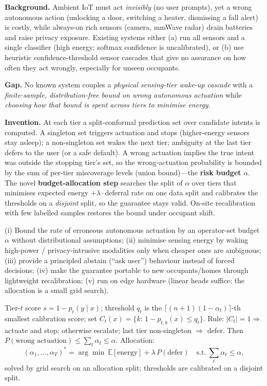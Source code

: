 \documentclass[10pt,a4paper]{article}
\newcommand{\sect}[1]{\par\vspace{5pt}{\bfseries\large #1}\par\vspace{1pt}}
\begin{document}
\sect{4. Summary and background of the invention (gap / novelty)}
\textbf{Background.} Ambient IoT must act \emph{invisibly} (no user prompts), yet a wrong autonomous action (unlocking a door, switching a heater, dismissing a fall alert) is costly, while always-on rich sensors (camera, mmWave radar) drain batteries and raise privacy exposure. Existing systems either (a) run all sensors and a single classifier (high energy; softmax confidence is uncalibrated), or (b) use heuristic confidence-threshold sensor cascades that give no assurance on how often they act wrongly, especially for unseen occupants.

\textbf{Gap.} No known system couples a \emph{physical sensing-tier wake-up cascade} with a \emph{finite-sample, distribution-free bound on wrong autonomous actuation} while \emph{choosing how that bound is spent across tiers to minimise energy}.

\textbf{Invention.} At each tier a split-conformal prediction set over candidate intents is computed. A singleton set triggers actuation and stops (higher-energy sensors stay asleep); a non-singleton set wakes the next tier; ambiguity at the last tier defers to the user (or a safe default). A wrong actuation implies the true intent was outside the stopping tier's set, so the wrong-actuation probability is bounded by the sum of per-tier miscoverage levels (union bound)---the \textbf{risk budget} $\alpha$. The novel \textbf{budget-allocation step} searches the split of $\alpha$ over tiers that minimises expected energy $+\lambda\cdot$deferral rate on one data split and calibrates the thresholds on a \emph{disjoint} split, so the guarantee stays valid. On-site recalibration with few labelled samples restores the bound under occupant shift.

\sect{5. Objective(s) of the invention}
(i) Bound the rate of erroneous autonomous actuation by an operator-set budget $\alpha$ without distributional assumptions; (ii) minimise sensing energy by waking high-power / privacy-intrusive modalities only when cheaper ones are ambiguous; (iii) provide a principled abstain (``ask user'') behaviour instead of forced decisions; (iv) make the guarantee portable to new occupants/homes through lightweight recalibration; (v) run on edge hardware (linear heads suffice; the allocation is a small grid search).

\sect{6. Working principle of the invention (in brief)}
Tier-$t$ score $s=1-p_t(y\mid x)$; threshold $q_t$ is the $\lceil (n+1)(1-\alpha_t)\rceil$-th smallest calibration score; set $C_t(x)=\{k:\,1-p_{t,k}(x)\le q_t\}$. Rule: $|C_t|=1\Rightarrow$ actuate and stop; otherwise escalate; last tier non-singleton $\Rightarrow$ defer. Then $P(\text{wrong actuation})\le\sum_t\alpha_t\le\alpha$. Allocation:
\[(\alpha_1,\dots,\alpha_T)^{*}=\arg\min\ \mathbb{E}[\text{energy}]+\lambda\,P(\text{defer})\quad\text{s.t.}\ \textstyle\sum_t\alpha_t\le\alpha,\]
solved by grid search on an allocation split; thresholds are calibrated on a disjoint split.
\end{document}
